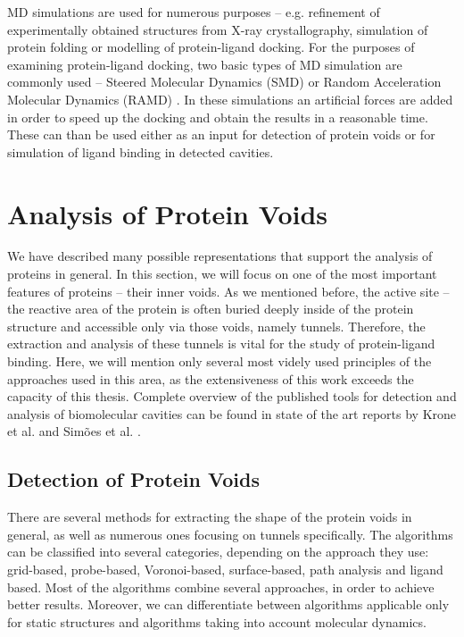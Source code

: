 MD simulations are used for numerous purposes -- e.g. refinement of experimentally obtained structures from X-ray crystallography, simulation of protein folding or modelling of protein-ligand docking. For the purposes of examining protein-ligand docking, two basic types of MD simulation are commonly used  -- Steered Molecular Dynamics (SMD) \cite{isralewitz2001steered} or Random Acceleration Molecular Dynamics (RAMD) \cite{ludemann2000substrates}. In these simulations an artificial forces are added in order to speed up the docking and obtain the results in a reasonable time. These can than be used either as an input for detection of protein voids or for simulation of ligand binding in detected cavities. 

\section{Analysis of Protein Voids}
We have described many possible representations that support the analysis of proteins in general. In this section, we will focus on one of the most important features of proteins -- their inner voids. As we mentioned before, the active site -- the reactive area of the protein is often buried deeply inside of the protein structure and accessible only via those voids, namely tunnels. Therefore, the extraction and analysis of these tunnels is vital for the study of protein-ligand binding. Here, we will mention only several most videly used principles of the approaches used in this area, as the extensiveness of this work exceeds the capacity of this thesis. Complete overview of the published tools for detection and analysis of biomolecular cavities can be found in state of the art reports by Krone et al. \cite{krone2016visual} and Simões et al. \cite{simoesgeometric}.

\subsection{Detection of Protein Voids}
There are several methods for extracting the shape of the protein voids in general, as well as numerous ones focusing on tunnels specifically. The algorithms can be classified into several categories, depending on the approach they use: grid-based, probe-based, Voronoi-based, surface-based, path analysis and ligand based. Most of the algorithms combine several approaches, in order to achieve better results. Moreover, we can differentiate  between algorithms applicable only for static structures and algorithms taking into account molecular dynamics.

